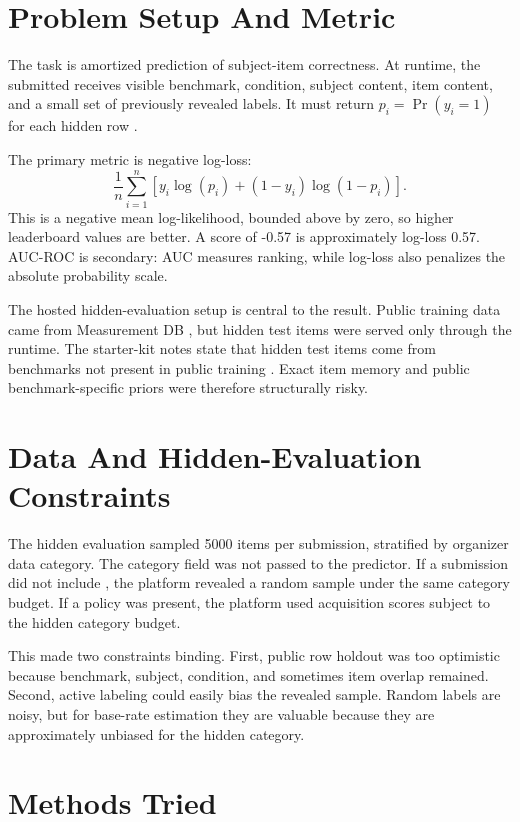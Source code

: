 \documentclass[11pt]{article}
\begin{document}
\section{Problem Setup And Metric}
The task is amortized prediction of subject-item correctness. At runtime, the submitted  receives visible benchmark, condition, subject content, item content, and a small set of previously revealed labels. It must return \(p_i=\Pr(y_i=1)\) for each hidden row \cite{predictive_asn,codabench_competition}.

The primary metric is negative log-loss:
\[
  \frac{1}{n} \sum_{i=1}^n
  \left[
    y_i\log(p_i)+(1-y_i)\log(1-p_i)
  \right].
\]
This is a negative mean log-likelihood, bounded above by zero, so higher leaderboard values are better. A score of -0.57 is approximately log-loss 0.57. AUC-ROC is secondary: AUC measures ranking, while log-loss also penalizes the absolute probability scale.

The hosted hidden-evaluation setup is central to the result. Public training data came from Measurement DB \cite{measurement_db}, but hidden test items were served only through the runtime. The starter-kit notes state that hidden test items come from benchmarks not present in public training \cite{predictive_asn}. Exact item memory and public benchmark-specific priors were therefore structurally risky.

\section{Data And Hidden-Evaluation Constraints}
The hidden evaluation sampled 5000 items per submission, stratified by organizer data category. The category field was not passed to the predictor. If a submission did not include , the platform revealed a random sample under the same category budget. If a policy was present, the platform used acquisition scores subject to the hidden category budget.

This made two constraints binding. First, public row holdout was too optimistic because benchmark, subject, condition, and sometimes item overlap remained. Second, active labeling could easily bias the revealed sample. Random labels are noisy, but for base-rate estimation they are valuable because they are approximately unbiased for the hidden category.

\section{Methods Tried}
\end{document}
